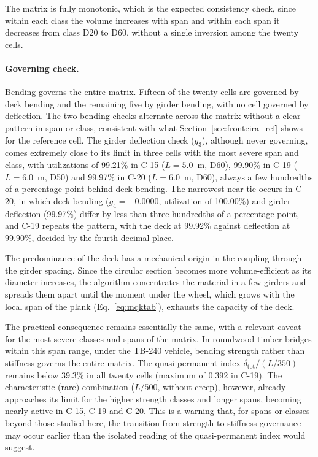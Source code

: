 The matrix is fully monotonic, which is the expected consistency check, since within each class the volume increases with span and within each span it decreases from class D20 to D60, without a single inversion among the twenty cells.

\paragraph{Governing check.} Bending governs the entire matrix. Fifteen of the twenty cells are governed by deck bending and the remaining five by girder bending, with no cell governed by deflection.
The two bending checks alternate across the matrix without a clear pattern in span or class, consistent with what Section~\ref{sec:fronteira_ref} shows for the reference cell.
The girder deflection check ($g_3$), although never governing, comes extremely close to its limit in three cells with the most severe span and class, with utilizations of 99.21\% in C-15 ($L = 5.0$~m, D60), 99.90\% in C-19 ($L = 6.0$~m, D50) and 99.97\% in C-20 ($L = 6.0$~m, D60), always a few hundredths of a percentage point behind deck bending.
The narrowest near-tie occurs in C-20, in which deck bending ($g_4 = -0.0000$, utilization of 100.00\%) and girder deflection (99.97\%) differ by less than three hundredths of a percentage point, and C-19 repeats the pattern, with the deck at 99.92\% against deflection at 99.90\%, decided by the fourth decimal place.

The predominance of the deck has a mechanical origin in the coupling through the girder spacing.
Since the circular section becomes more volume-efficient as its diameter increases, the algorithm concentrates the material in a few girders and spreads them apart until the moment under the wheel, which grows with the local span of the plank (Eq.~\eqref{eq:mqktab}), exhausts the capacity of the deck.

The practical consequence remains essentially the same, with a relevant caveat for the most severe classes and spans of the matrix.
In roundwood timber bridges within this span range, under the TB-240 vehicle, bending strength rather than stiffness governs the entire matrix. The quasi-permanent index $\delta_{\mathrm{tot}}/(L/350)$ remains below 39.3\% in all twenty cells (maximum of 0.392 in C-19).
The characteristic (rare) combination ($L/500$, without creep), however, already approaches its limit for the higher strength classes and longer spans, becoming nearly active in C-15, C-19 and C-20. This is a warning that, for spans or classes beyond those studied here, the transition from strength to stiffness governance may occur earlier than the isolated reading of the quasi-permanent index would suggest.

